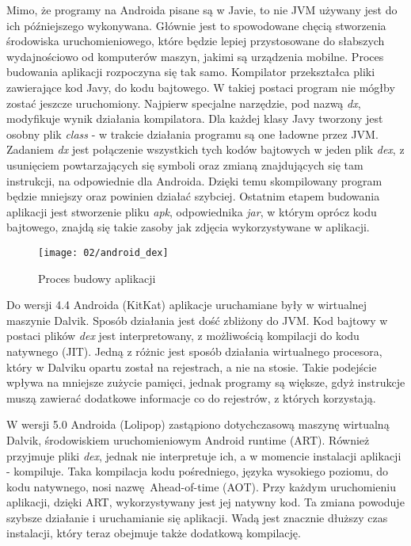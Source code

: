 Mimo, że programy na Androida pisane są w Javie, to nie JVM używany jest do ich późniejszego wykonywana. Głównie jest to spowodowane chęcią stworzenia środowiska uruchomieniowego, które będzie lepiej przystosowane do słabszych wydajnościowo od komputerów maszyn, jakimi są urządzenia mobilne. Proces budowania aplikacji rozpoczyna się tak samo. Kompilator przekształca pliki zawierające kod Javy, do kodu bajtowego. W takiej postaci program nie mógłby zostać jeszcze uruchomiony. Najpierw specjalne narzędzie, pod nazwą \textit{dx}, modyfikuje wynik działania kompilatora. Dla każdej klasy Javy tworzony jest osobny plik \textit{class} - w trakcie działania programu są one ładowne przez JVM. Zadaniem \textit{dx} jest połączenie wszystkich tych kodów bajtowych w jeden plik \textit{dex}, z usunięciem powtarzających się symboli oraz zmianą znajdujących się tam instrukcji, na odpowiednie dla Androida. Dzięki temu skompilowany program będzie mniejszy oraz powinien działać szybciej. Ostatnim etapem budowania aplikacji jest stworzenie pliku \textit{apk}, odpowiednika \textit{jar}, w którym oprócz kodu bajtowego, znajdą się takie zasoby jak zdjęcia wykorzystywane w aplikacji.

\begin{figure}[h]
	\begin{center}
		\texttt{[image: 02/android\_dex]}
	\end{center}
	\caption{Proces budowy aplikacji}
	\vspace{-0.5cm}
\end{figure}

Do wersji 4.4 Androida (KitKat) aplikacje uruchamiane były w wirtualnej maszynie Dalvik. Sposób działania jest dość zbliżony do JVM. Kod bajtowy w postaci plików \textit{dex} jest interpretowany, z możliwością kompilacji do kodu natywnego (JIT). Jedną z różnic jest sposób działania wirtualnego procesora, który w Dalviku opartu został na rejestrach, a nie na stosie. Takie podejście wpływa na mniejsze zużycie pamięci, jednak programy są większe, gdyż instrukcje muszą zawierać dodatkowe informacje co do rejestrów, z których korzystają.

W wersji 5.0 Androida (Lolipop) zastąpiono dotychczasową maszynę wirtualną Dalvik, środowiskiem uruchomieniowym Android runtime (ART). Również przyjmuje pliki \textit{dex}, jednak nie interpretuje ich, a w momencie instalacji aplikacji - kompiluje. Taka kompilacja kodu pośredniego, języka wysokiego poziomu, do kodu natywnego, nosi nazwę Ahead-of-time (AOT). Przy każdym uruchomieniu aplikacji, dzięki ART, wykorzystywany jest jej natywny kod. Ta zmiana powoduje szybsze działanie i uruchamianie się aplikacji. Wadą jest znacznie dłuższy czas instalacji, który teraz obejmuje także dodatkową kompilację.

